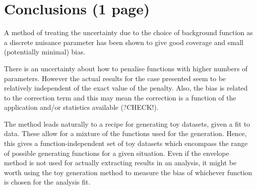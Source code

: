 \section{Conclusions (1 page)}
\label{sec:conclusions}

A method of treating the uncertainty due to the choice of background function
as a discrete nuisance parameter has been shown to give good coverage and
small (potentially minimal) bias.

There is an uncertainty about how to penalise functions with higher numbers
of parameters. However the actual results for the case presented
seem to be relatively independent of the exact value of the penalty.
Also, the bias is related to the correction term and this may mean the
correction is a function of the application and/or statistics available (?CHECK!).

The method leads naturally to a recipe for generating toy datasets, given
a fit to data. These allow for a mixture of the functions used for the
generation. Hence, this gives a function-independent set of toy
datasets which encompass the range of possible generating functions for
a given situation.
Even if the envelope method is not used for actually extracting results
in an analysis, it might be worth using the toy generation method to measure
the bias of whichever function is chosen for the analysis fit.

